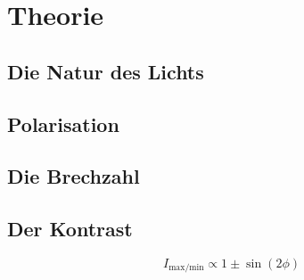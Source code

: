 
\section{Theorie}

\subsection{Die Natur des Lichts}

\subsection{Polarisation}

\subsection{Die Brechzahl}

\subsection{Der Kontrast}

\begin{equation}
  \label{eq:intens_contrast}
  I_\text{max/min} \propto 1 \pm \sin(2\phi)
\end{equation}
